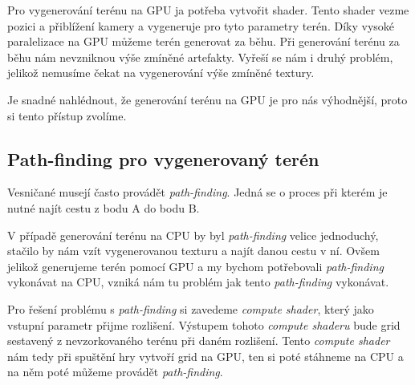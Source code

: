 Pro vygenerování terénu na GPU ja potřeba vytvořit shader. Tento shader vezme pozici a přiblížení kamery a vygeneruje pro tyto parametry terén. Díky vysoké paralelizace na GPU můžeme terén generovat za běhu. Při generování terénu za běhu nám nevzniknou výše zmíněné artefakty. Vyřeší se nám i druhý problém, jelikož nemusíme čekat na vygenerování výše zmíněné textury.

Je snadné nahlédnout, že generování terénu na GPU je pro nás výhodnější, proto si tento přístup zvolíme.

\subsection{Path-finding pro vygenerovaný terén}
\label{subsection:path-finding}
Vesničané musejí často provádět \textit{path-finding}. Jedná se o proces při kterém je nutné najít cestu z bodu A do bodu B.

V případě generování terénu na CPU by byl \textit{path-finding} velice jednoduchý, stačilo by nám vzít vygenerovanou texturu a najít danou cestu v ní. Ovšem jelikož generujeme terén pomocí GPU a my bychom potřebovali \textit{path-finding} vykonávat na CPU, vzniká nám tu problém jak tento \textit{path-finding} vykonávat.

Pro řešení problému s \textit{path-finding} si zavedeme \textit{compute shader}, který jako vstupní parametr přijme rozlišení. Výstupem tohoto \textit{compute shaderu} bude grid sestavený z nevzorkovaného terénu při daném rozlišení. Tento \textit{compute shader} nám tedy při spuštění hry vytvoří grid na GPU, ten si poté stáhneme na CPU a na něm poté můžeme provádět \textit{path-finding}.
















